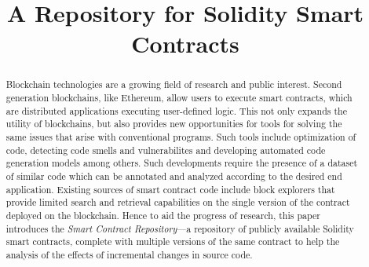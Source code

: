 \documentclass[10pt,conference]{IEEEtran}
\begin{document}
	
	\title{A Repository for Solidity Smart Contracts\\}
	
	\author{
		\and
		\and
		\and
		\and
		}
	
	\maketitle
	
	\begin{abstract}
		Blockchain technologies are a growing field of research and public interest. Second generation blockchains, like Ethereum, allow users to execute smart contracts, which are distributed applications executing user-defined logic. This not only expands the utility of blockchains, but also provides new opportunities for tools for solving the same issues that arise with conventional programs. Such tools include optimization of code, detecting code smells and vulnerabilites and developing automated code generation models among others. Such developments require the presence of a dataset of similar code which can be annotated and analyzed according to the desired end application. Existing sources of smart contract code include block explorers that provide limited search and retrieval capabilities on the single version of the contract deployed on the blockchain. Hence to aid the progress of research, this paper introduces the \textit{Smart Contract Repository}---a repository of publicly available Solidity smart contracts, complete with multiple versions of the same contract to help the analysis of the effects of incremental changes in source code.
	\end{abstract}
	
\end{document}
